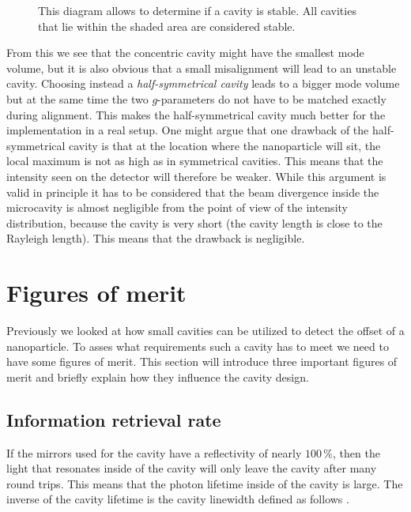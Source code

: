 \begin{figure}[H]
	
	\caption{This diagram allows to determine if a cavity is stable. All cavities that lie within the shaded area are considered stable.}
	\label{fig:CavityStabilityDiagram}
\end{figure}

From this we see that the concentric cavity might have the smallest mode volume, but it is also obvious that a small misalignment will lead to an unstable cavity. Choosing instead a \textit{half-symmetrical cavity} leads to a bigger mode volume but at the same time the two $g$-parameters do not have to be matched exactly during alignment. This makes the half-symmetrical cavity much better for the implementation in a real setup. One might argue that one drawback of the half-symmetrical cavity is that at the location where the nanoparticle will sit, the local maximum is not as high as in symmetrical cavities. This means that the intensity seen on the detector will therefore be weaker. While this argument is valid in principle it has to be considered that the beam divergence inside the microcavity is almost negligible from the point of view of the intensity distribution, because the cavity is very short (the cavity length is close to the Rayleigh length). This means that the drawback is negligible.

\section{Figures of merit}
Previously we looked at how small cavities can be utilized to detect the offset of a nanoparticle. To asses what requirements such a cavity has to meet we need to have some figures of merit. This section will introduce three important figures of merit and briefly explain how they influence the cavity design.

\subsection{Information retrieval rate}\label{ChapInformationRetrievalRate}
If the mirrors used for the cavity have a reflectivity of nearly $100\,\%$, then the light that resonates inside of the cavity will only leave the cavity after many round trips. This means that the photon lifetime inside of the cavity is large. The inverse of the cavity lifetime is the cavity linewidth defined as follows \cite{chang2010cavity}.

